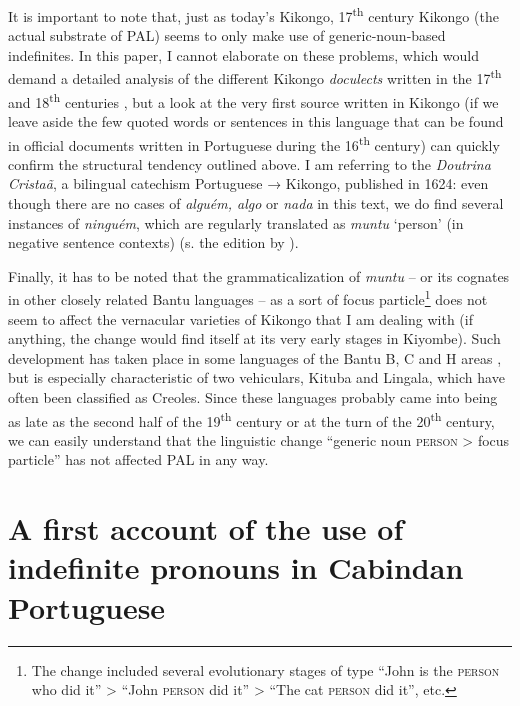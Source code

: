 \documentclass[output=paper,colorlinks,citecolor=brown]{langscibook}
\begin{document}
It is important to note that, just as today’s Kikongo, 17\textsuperscript{th} century Kikongo (the actual substrate of PAL) seems to only make use of generic-noun-based indefinites. In this paper, I cannot elaborate on these problems, which would demand a detailed analysis of the different Kikongo \textit{doculects} written in the 17\textsuperscript{th} and 18\textsuperscript{th} centuries \citep{BostoenDeSchryver2015, BostoenDeSchryver2018}, but a look at the very first source written in Kikongo (if we leave aside the few quoted words or sentences in this language that can be found in official documents written in Portuguese during the 16\textsuperscript{th} century) can quickly confirm the structural tendency outlined above. I am referring to the \textit{Doutrina Cristaã}, a bilingual catechism Portuguese → Kikongo, published in 1624: even though there are no cases of \textit{alguém, algo} or \textit{nada} in this text, we do find several instances of \textit{ninguém}, which are regularly translated as \textit{muntu} ‘person’ (in negative sentence contexts) (s. the edition by \citealt[][119, 145, 195]{Bontinck1978}).

Finally, it has to be noted that the grammaticalization of \textit{muntu} -- or its cognates in other closely related Bantu languages -- as a sort of focus particle\footnote{The change included several evolutionary stages of type “John is the \textsc{person} who did it” > “John \textsc{person} did it” > “The cat \textsc{person} did it”, etc.} does not seem to affect the vernacular varieties of Kikongo that I am dealing with (if anything, the change would find itself at its very early stages in Kiyombe). Such development has taken place in some languages of the Bantu B, C and H areas \citep{VanderWalManiacky2015}, but is especially characteristic of two vehiculars, Kituba and Lingala, which have often been classified as Creoles. Since these languages probably came into being as late as the second half of the 19\textsuperscript{th} century or at the turn of the 20\textsuperscript{th} century, we can easily understand that the linguistic change “generic noun \textsc{person} > focus particle” has not affected PAL in any way.

\section{A first account of the use of indefinite pronouns in Cabindan Portuguese}\label{sec:gut4}
\end{document}
